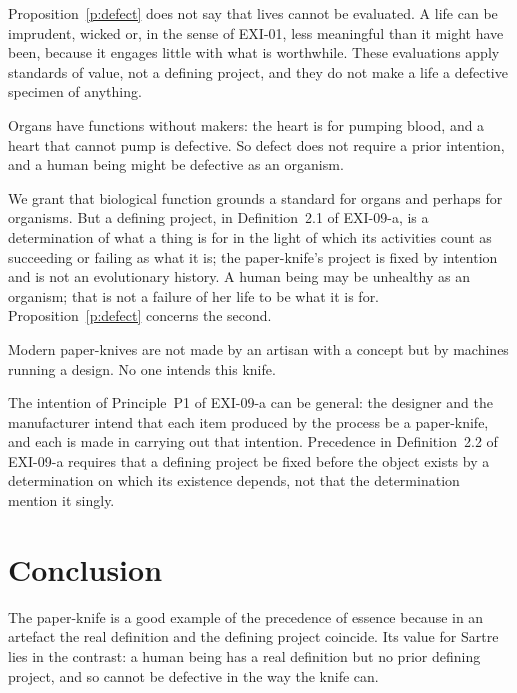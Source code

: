 \documentclass{situationist-preprint}
\begin{document}
Proposition~\ref{p:defect} does not say that lives cannot be evaluated. A life can be imprudent, wicked or, in the sense of EXI-01, less meaningful than it might have been, because it engages little with what is worthwhile. These evaluations apply standards of value, not a defining project, and they do not make a life a defective specimen of anything.

\begin{objection}
Organs have functions without makers: the heart is for pumping blood, and a heart that cannot pump is defective. So defect does not require a prior intention, and a human being might be defective as an organism.
\end{objection}

\begin{reply}
We grant that biological function grounds a standard for organs and perhaps for organisms. But a defining project, in Definition~2.1 of EXI-09-a, is a determination of what a thing is for in the light of which its activities count as succeeding or failing as what it is; the paper-knife's project is fixed by intention and is not an evolutionary history. A human being may be unhealthy as an organism; that is not a failure of her life to be what it is for. Proposition~\ref{p:defect} concerns the second.
\end{reply}

\begin{objection}
Modern paper-knives are not made by an artisan with a concept but by machines running a design. No one intends this knife.
\end{objection}

\begin{reply}
The intention of Principle~P1 of EXI-09-a can be general: the designer and the manufacturer intend that each item produced by the process be a paper-knife, and each is made in carrying out that intention. Precedence in Definition~2.2 of EXI-09-a requires that a defining project be fixed before the object exists by a determination on which its existence depends, not that the determination mention it singly.
\end{reply}

\section{Conclusion}

The paper-knife is a good example of the precedence of essence because in an artefact the real definition and the defining project coincide. Its value for Sartre lies in the contrast: a human being has a real definition but no prior defining project, and so cannot be defective in the way the knife can.
\end{document}
